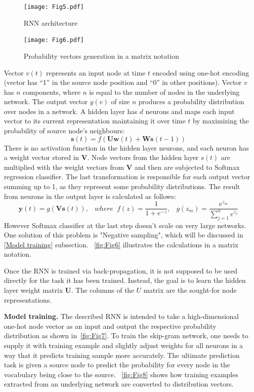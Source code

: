 \begin{figure}[H]
    \centering
    \texttt{[image: Fig5.pdf]}
    \caption{RNN architecture}
    \label{fig:Fig5}
\end{figure}
\begin{figure}[H]
    \centering
    \texttt{[image: Fig6.pdf]}
    \caption{Probability vectors generation in a matrix notation}
    \label{fig:Fig6}
\end{figure}

Vector $v(t)$ represents an input node at time $t$ encoded using one-hot encoding (vector has “1” in the source node position and “0” in other positions). Vector $v$ has $n$ components, where $n$ is equal to the number of nodes in the underlying network. The output vector $y(v)$ of size $n$ produces a probability distribution over nodes in a network. A hidden layer has $d$ neurons and maps each input vector to its current representation maintaining it over time $t$ by maximizing the probability of source node’s neighbours:
\begin{equation}
  \textbf{s}(t) = f(\textbf{Uw}(t) + \textbf{Ws}(t-1))
    \label{eq:equat3}
\end{equation}
There is no activation function in the hidden layer neurons, and each neuron has a weight vector stored in $\textbf{V}$. Node vectors from the hidden layer $s(t)$ are multiplied with the weight vectors from $\textbf{V}$ and then are subjected to Softmax regression classifier. The last transformation is responsible for each output vector summing up to 1, as they represent some probability distributions. The result from neurons in the output layer is calculated as follows:
\begin{equation}
  \textbf{y}(t) = g(\textbf{Vs}(t)),\;\;\;
  where \;\; f(z)= \frac{1}{1+e^{-z}},\;\;\; g(z_m)=\frac{e^{z_m}}{\sum\limits_{j=1}^n e^{z_j}}
\label{eq:equat4}
\end{equation}
However Softmax classifier at the last step doesn't scale on very large networks. One solution of this problem is "Negative sampling", which will be discussed in \ref{Model training} subsection. ~\autoref{fig:Fig6} illustrates the calculations in a matrix notation. 

Once the RNN is trained via back-propagation, it is not supposed to be used directly for the task it has been trained. Instead, the goal is to learn the hidden layer weight matrix $\textbf{U}$. The columns of the $U$ matrix are the sought-for node representations.

\textbf{Model training. }
\label{Model training}
The described RNN is intended to take a high-dimensional one-hot node vector as an input and output the respective probability distribution as shown in~\autoref{fig:Fig7}.
To train the skip-gram network, one needs to supply it with training example and slightly adjust weights for all neurons in a way that it predicts training sample more accurately. The ultimate prediction task is given a source node to predict the probability for every node in the vocabulary being close to the source. ~\autoref{fig:Fig8} shows how training examples extracted from an underlying network are converted to distribution vectors.

